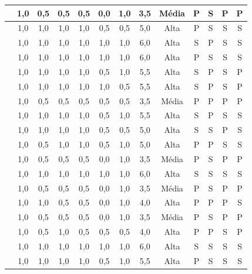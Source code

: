 \begin{scriptsize}
\begin{longtable}{|p{3cm}|c|c|c|c|c|c|c|c|c|c|c|c|}
\cite{ramineni2024enhancing}      & 1,0 & 0,5 & 0,5 & 0,5 & 0,0 & 1,0 & 3,5 & Média & P & S & P & P \\ \hline
\cite{lee2021factors}             & 1,0 & 1,0 & 1,0 & 1,0 & 0,5 & 0,5 & 5,0 & Alta  & P & S & S & S \\ \hline
\cite{barron2013feasibility}      & 1,0 & 1,0 & 1,0 & 1,0 & 1,0 & 1,0 & 6,0 & Alta  & S & P & S & S \\ \hline
\cite{dombrovskaia2021guideline}  & 1,0 & 1,0 & 1,0 & 1,0 & 1,0 & 1,0 & 6,0 & Alta  & P & S & S & S \\ \hline
\cite{sadeghi2020hci}             & 1,0 & 1,0 & 1,0 & 1,0 & 0,5 & 1,0 & 5,5 & Alta  & S & P & S & P \\ \hline
\cite{yalcin2018keshif}           & 1,0 & 1,0 & 1,0 & 1,0 & 1,0 & 0,5 & 5,5 & Alta  & S & P & S & P \\ \hline
\cite{abdullah2025navigating}     & 1,0 & 0,5 & 0,5 & 0,5 & 0,5 & 0,5 & 3,5 & Média & P & P & P & P \\ \hline
\cite{nosseir2011novice}          & 1,0 & 1,0 & 1,0 & 1,0 & 0,5 & 1,0 & 5,5 & Alta  & S & P & S & S \\ \hline
\cite{ko2019old}                  & 1,0 & 1,0 & 1,0 & 1,0 & 0,5 & 0,5 & 5,0 & Alta  & S & S & P & S \\ \hline
\cite{filgueiras2009recoverability}& 1,0 & 0,5 & 1,0 & 1,0 & 0,5 & 1,0 & 5,0 & Alta  & P & P & S & S \\ \hline
\cite{wang2020research}           & 1,0 & 0,5 & 0,5 & 0,5 & 0,0 & 1,0 & 3,5 & Média & P & S & P & P \\ \hline
\cite{gatsou2017seniors}          & 1,0 & 1,0 & 1,0 & 1,0 & 1,0 & 1,0 & 6,0 & Alta  & S & S & S & S \\ \hline
\cite{shi2016supporting}          & 1,0 & 0,5 & 0,5 & 0,5 & 0,0 & 1,0 & 3,5 & Média & P & S & P & P \\ \hline
\cite{ahmad2013teaching}          & 1,0 & 1,0 & 0,5 & 0,5 & 0,0 & 1,0 & 4,0 & Alta  & P & P & P & S \\ \hline
\cite{sun2010preliminary}         & 1,0 & 0,5 & 0,5 & 0,5 & 0,0 & 1,0 & 3,5 & Média & P & S & P & P \\ \hline
\cite{ueki2025ucker}              & 1,0 & 0,5 & 1,0 & 0,5 & 0,5 & 0,5 & 4,0 & Alta  & P & P & S & P \\ \hline
\cite{xie2010usability}           & 1,0 & 1,0 & 1,0 & 1,0 & 1,0 & 1,0 & 6,0 & Alta  & S & S & S & S \\ \hline
\cite{balakrishnan2012user}       & 1,0 & 1,0 & 1,0 & 1,0 & 0,5 & 1,0 & 5,5 & Alta  & P & S & S & S \\ \hline

\end{longtable}
\end{scriptsize}
